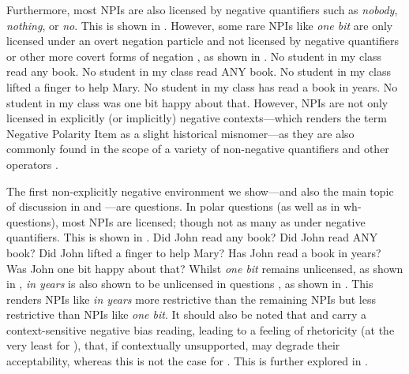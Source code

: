 Furthermore, most NPIs are also licensed by negative quantifiers such as \textit{nobody}, \textit{nothing}, or \textit{no}. This is shown in . However, some rare NPIs like \textit{one bit} are only licensed under an overt negation particle and not licensed by negative quantifiers or other more covert forms of negation \parencite{Zwarts1993,Zwarts1998}, as shown in .
\pex[nopreamble=true]\label{ex:npi-dm}%
\a{} No student in my class read any book.
\a{} No student in my class read \MakeUppercase{any} book.
\a{} No student in my class lifted a finger to help Mary.
\a{} No student in my class has read a book in years.
\a{}\ljudge{\#} No student in my class was one bit happy about that.
\xe
However, NPIs are not only licensed in explicitly (or implicitly) negative contexts---which renders the term Negative Polarity Item as a slight historical misnomer---as they are also commonly found in the scope of a variety of non-negative quantifiers and other operators \parencite[see, amongst many subsequent others,][]{Klima1964,Ladusaw1980,Hoeksema1983,Linebarger1987,Wouden1997,Giannakidou1998}.

The first non-explicitly negative environment we show---and also the main topic of discussion in  and ---are questions. In polar questions (as well as in wh-questions), most NPIs are licensed; though not as many as under negative quantifiers. This is shown in . 
\pex[nopreamble=true]\label{ex:npi-question}%
\a{} Did John read any book?
\a{} Did John read \MakeUppercase{any} book?
\a{} Did John lifted a finger to help Mary?
\a{}\ljudge{\#} Has John read a book in years?
\a{}\ljudge{\#} Was John one bit happy about that?
\xe
Whilst \textit{one bit} remains unlicensed, as shown in , \textit{in years} is also shown to be unlicensed in questions \parencite{Nicolae2015,Roelofsen2018,Jeong2021,Jeong2022}, as shown in . This renders NPIs like \textit{in years} more restrictive than the remaining NPIs but less restrictive than NPIs like \textit{one bit}. It should also be noted that  and  carry a context-sensitive negative bias reading, leading to a feeling of rhetoricity (at the very least for ), that, if contextually unsupported, may degrade their acceptability, whereas this is not the case for . This is further explored in .

